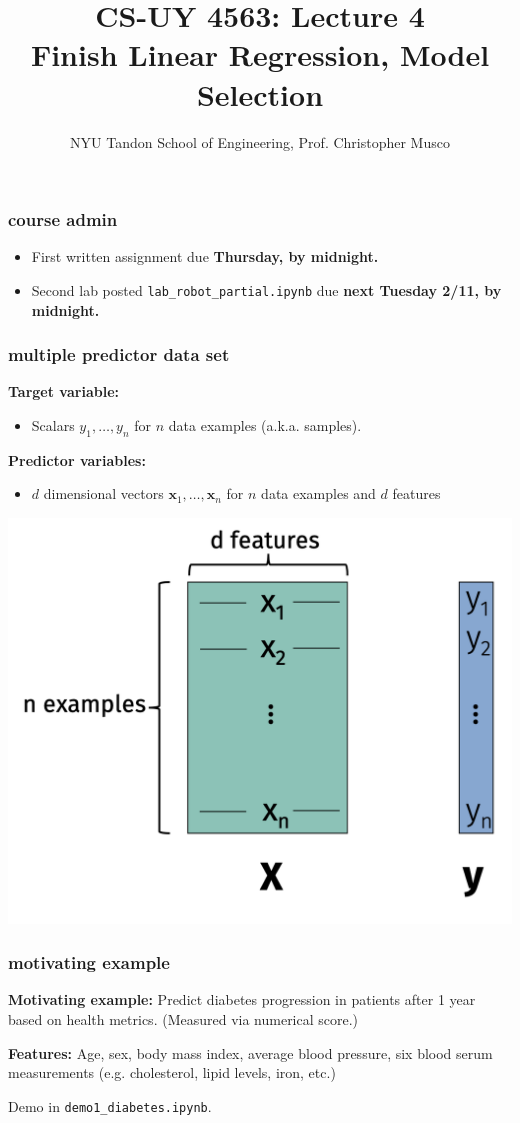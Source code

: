 \documentclass[handout,compress]{beamer}
\title{CS-UY 4563: Lecture 4 \\ Finish Linear Regression, Model Selection}
\author{NYU Tandon School of Engineering, Prof. Christopher Musco}
\date{}
\newcommand{\bv}[1]{\mathbf{#1}}
\begin{document}
\begin{frame}
	\titlepage 
\end{frame}

\begin{frame}
	\frametitle{course admin}
	\begin{itemize}
		\item First written assignment  due \textbf{Thursday, by midnight.}
		\item Second lab posted \texttt{lab\_robot\_partial.ipynb} due \textbf{next Tuesday 2/11, by midnight.}
	\end{itemize}
	\end{frame}

\begin{frame}
	\frametitle{multiple predictor data set}
	\textbf{Target variable:}
	\begin{itemize}
		\item Scalars $y_1, \ldots, y_n$ for $n$ data examples (a.k.a. samples).
	\end{itemize}
	\textbf{Predictor variables:}
	\begin{itemize}
		\item $d$ dimensional vectors $\bv{x}_1, \ldots, \bv{x}_n$ for $n$ data examples and $d$ features
	\end{itemize}
	\vspace{-1.5em}
	
	\begin{center}
		\includegraphics[width=.6\textwidth]{dataset.png}
	\end{center}
\end{frame}

\begin{frame}
	\frametitle{motivating example}
	\textbf{Motivating example:} Predict diabetes progression in patients after 1 year based on health metrics. (Measured via numerical score.) \vspace{1em}
	
	\textbf{Features:} Age, sex, body mass index, average blood pressure, six blood serum measurements (e.g. cholesterol, lipid levels, iron, etc.)
	
	\begin{center}
		Demo in \texttt{demo1\_diabetes.ipynb}. 
	\end{center}
\end{frame}
\end{document}
